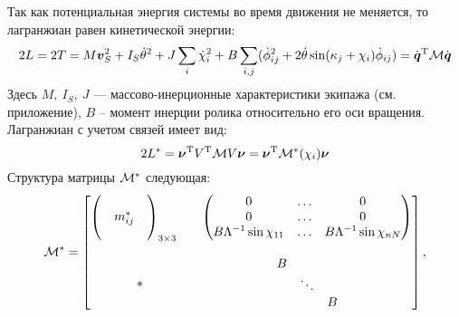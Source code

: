 Так как потенциальная энергия системы во время движения не меняется, то лагранжиан  равен кинетической энергии:
\begin{equation}\label{kin_en}
    2L = 2T = M\vec{v}_S^2 + I_S\dot{\theta}^2 + J\sum_i\dot{\chi}_i^2 + B\sum_{i,j}(\dot{\phi}_{ij}^2 + 2\dot{\theta}\sin(\kappa_j + \chi_i)\dot{\phi}_{ij})=\dot{\vec{q}}^\mathrm{T}\M\dot{\vec{q}}
\end{equation}
Здесь $M,\ I_S,\ J$ --- массово-инерционные характеристики экипажа (см. приложение), $B$ -- момент инерции ролика относительно его оси вращения. Лагранжиан с учетом связей имеет вид:
$$ 2L^{*}  = \vec{\nu}^\mathrm{T} V^\mathrm{T}\M V\vec{\nu} = \vec{\nu}^\mathrm{T} \M^*(\chi_i)\vec{\nu} $$
Структура матрицы $\mathcal{M}^*$ следующая:
$$
\mathcal{M}^* = \begin{bmatrix}
        \left(\begin{matrix}&&\\&m^*_{ij}&\\&&\end{matrix}\right)_{3\times3} \quad & \left(\begin{matrix} 0&\ldots& 0 \\ 0&\ldots&0 \\ B\Lambda^{-1}\sin\chi_{11}&\ldots& B\Lambda^{-1}\sin\chi_{nN} \end{matrix}\right) \\[25pt]
        *          & \begin{matrix} B & & \\ & \ddots & \\ & & B \end{matrix} \\
    \end{bmatrix},
$$

